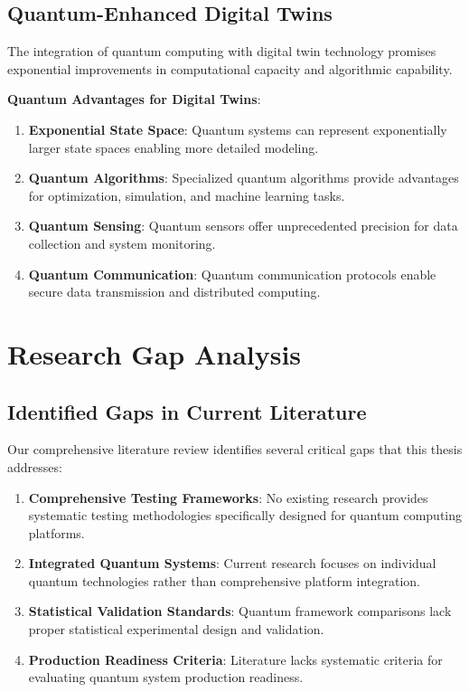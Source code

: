 \documentclass[12pt,a4paper]{report}
\begin{document}
\subsection{Quantum-Enhanced Digital Twins}

The integration of quantum computing with digital twin technology promises exponential improvements in computational capacity and algorithmic capability.

\textbf{Quantum Advantages for Digital Twins}:
\begin{enumerate}
\item \textbf{Exponential State Space}: Quantum systems can represent exponentially larger state spaces enabling more detailed modeling.

\item \textbf{Quantum Algorithms}: Specialized quantum algorithms provide advantages for optimization, simulation, and machine learning tasks.

\item \textbf{Quantum Sensing}: Quantum sensors offer unprecedented precision for data collection and system monitoring.

\item \textbf{Quantum Communication}: Quantum communication protocols enable secure data transmission and distributed computing.
\end{enumerate}

\section{Research Gap Analysis}

\subsection{Identified Gaps in Current Literature}

Our comprehensive literature review identifies several critical gaps that this thesis addresses:

\begin{enumerate}
\item \textbf{Comprehensive Testing Frameworks}: No existing research provides systematic testing methodologies specifically designed for quantum computing platforms.

\item \textbf{Integrated Quantum Systems}: Current research focuses on individual quantum technologies rather than comprehensive platform integration.

\item \textbf{Statistical Validation Standards}: Quantum framework comparisons lack proper statistical experimental design and validation.

\item \textbf{Production Readiness Criteria}: Literature lacks systematic criteria for evaluating quantum system production readiness.
\end{enumerate}
\end{document}
